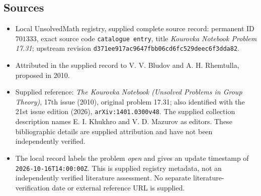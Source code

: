 \documentclass[11pt]{article}
\begin{document}
\subsection{Sources}
\begin{itemize}
\item Local UnsolvedMath registry, supplied complete source record: permanent ID \(701333\), exact source code \texttt{catalogue entry}, title \emph{Kourovka Notebook Problem 17.31}; upstream revision \texttt{d371ee917ac9647fbb06cd6fc529deec6f3dda82}.
\item Attributed in the supplied record to V. V. Bludov and A. H. Rhemtulla, proposed in 2010.
\item Supplied reference: \emph{The Kourovka Notebook (Unsolved Problems in Group Theory)}, 17th issue (2010), original problem 17.31; also identified with the 21st issue edition (2026), \texttt{arXiv:1401.0300v48}. The supplied collection description names E. I. Khukhro and V. D. Mazurov as editors. These bibliographic details are supplied attribution and have not been independently verified.
\item The local record labels the problem \emph{open} and gives an update timestamp of \texttt{2026-10-16T14:00:00Z}. This is supplied registry metadata, not an independently verified literature assessment. No separate literature-verification date or external reference URL is supplied.
\end{itemize}
\end{document}
